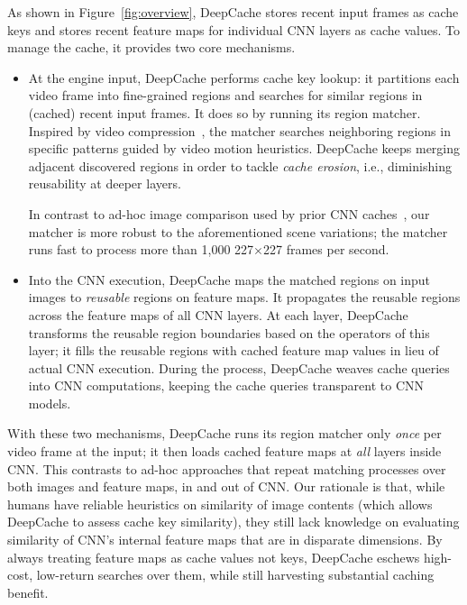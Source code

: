 \documentclass[10pt,acmtog]{acmart}
\newcommand{\framework}{DeepCache\xspace}
\newcommand{\sys}{\framework{}}
\newcommand{\variation}{scene variations\xspace}
\begin{document}
As shown in Figure~\ref{fig:overview},
\sys{} stores recent input frames as cache keys and stores recent feature maps for individual CNN layers as cache values. 
To manage the cache, it provides two core mechanisms.
\begin{itemize}
\item 
At the engine input, \sys{} performs cache key lookup: it partitions each video frame into fine-grained regions and searches for similar regions in (cached) recent input frames. 
It does so by running its region matcher. 
Inspired by video compression~\cite{zhu1997new}, the matcher searches neighboring regions in specific patterns guided by video motion heuristics.
\sys{} keeps merging adjacent discovered regions in order to tackle \textit{cache erosion}, i.e., diminishing reusability at deeper layers. 

In contrast to ad-hoc image comparison used by prior CNN caches~\cite{conf/mobisys/LocLB17,cavigelli2017cbinfer}, our matcher is more robust to the aforementioned \variation; 
the matcher runs fast to process more than 1,000 227$\times$227 frames per second.



\item 
Into the CNN execution, \sys{} maps the matched regions on input images to \textit{reusable} regions on feature maps.
It propagates the reusable regions across the feature maps of all CNN layers. 
At each layer, \sys{} transforms the reusable region boundaries based on the operators of this layer; 
it fills the reusable regions with cached feature map values in lieu of actual CNN execution. 
During the process, \sys{} weaves cache queries into CNN computations, keeping the cache queries transparent to CNN models. 

\end{itemize}

With these two mechanisms, \sys{} runs its region matcher only \textit{once} per video frame at the input; it then loads cached feature maps at \textit{all} layers inside CNN. 
This contrasts to ad-hoc approaches that repeat matching processes over both images and feature maps, in and out of CNN.
Our rationale is that, while humans have reliable heuristics on similarity of image contents (which allows \sys{} to assess cache key similarity), they still lack knowledge on evaluating similarity of CNN's internal feature maps that are in disparate dimensions. 
By always treating feature maps as cache values not keys, \sys{} eschews high-cost, low-return searches over them, while still harvesting substantial caching benefit. 
\end{document}
